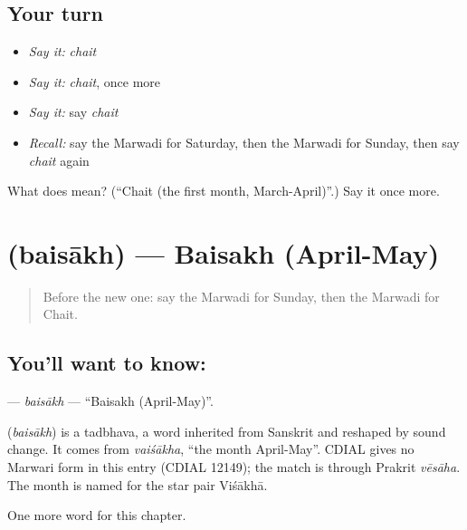 \subsection*{Your turn}
\begin{itemize}
\raggedright
  \item \emph{Say it:} \emph{chait}
  \item \emph{Say it:} \emph{chait}, once more
  \item \emph{Say it:} say \emph{chait}
  \item \emph{Recall:} say the Marwadi for Saturday, then the Marwadi for Sunday, then say \emph{chait} again
\end{itemize}

\begin{tcolorbox}[breakable,colback=teal!4,colframe=teal!35!black,title={Before you move on}]
What does  mean? (\textquotedblleft{}Chait (the first month, March-April)\textquotedblright{}.) Say it once more.
\end{tcolorbox}
\section[\texorpdfstring{\mw{बैसाख} (baisākh)}{बैसाख (baisākh)}]{ (baisākh) — Baisakh (April-May)}

\label{lesson:MW-C92-baisakh}



\begin{quote}
Before the new one: say the Marwadi for Sunday, then the Marwadi for Chait.
\end{quote}

\subsection*{You'll want to know: }
\textbf{} — \emph{baisākh} — \textquotedblleft{}Baisakh (April-May)\textquotedblright{}.

\begin{cousinweb}
\textbf{} (\emph{baisākh}) is a tadbhava, a word inherited from Sanskrit and reshaped by sound change. It comes from \emph{vaiśākha}, \textquotedblleft{}the month April-May\textquotedblright{}. CDIAL gives no Marwari form in this entry (CDIAL 12149); the match is through Prakrit \emph{vēsāha}. The month is named for the star pair Viśākhā.
\end{cousinweb}

\begin{grammarlens}[title={What you've built}]
One more word for this chapter.
\end{grammarlens}

